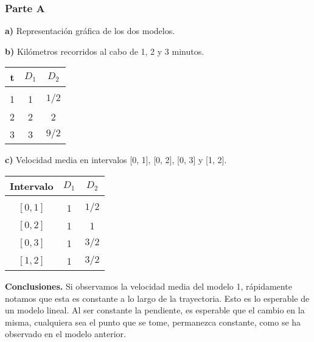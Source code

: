 \subsubsection*{Parte A}

\textbf{a)} Representación gráfica de los dos modelos.

\begin{center}
\end{center}

\textbf{b)} Kilómetros recorridos al cabo de 1, 2 y 3 minutos.

\begin{center}
\begin{tabular}{ c c c }
	t	&	$D_1$  &   $D_2$  \\
	\hline \\
	1	&	1     &   $1/2$\\	
	2	&	2     &   2\\	
	3	&	3     &   $9/2$\\
    \hline
\end{tabular}
\end{center}

\textbf{c)} Velocidad media en intervalos [0, 1], [0, 2], [0, 3] y [1, 2].

\begin{center}
\begin{tabular}{ c c c }
	Intervalo	&	$D_1$  &   $D_2$ \\
	\hline \\
	$[0, 1]$    &	 1     &   $1/2$ \\	
	$[0, 2]$    &	 1     &   1     \\	
	$[0, 3]$    &	 1     &   $3/2$ \\
    $[1, 2]$    &    1     &   $3/2$ \\
    \hline
\end{tabular}
\end{center}

\textbf{Conclusiones.} Si observamos la velocidad media del modelo 1, rápidamente notamos que esta es constante a lo largo de la trayectoria. Esto es lo esperable de un modelo lineal. Al ser constante la pendiente, es esperable que el cambio en la misma, cualquiera sea el punto que se tome, permanezca constante, como se ha observado en el modelo anterior.

